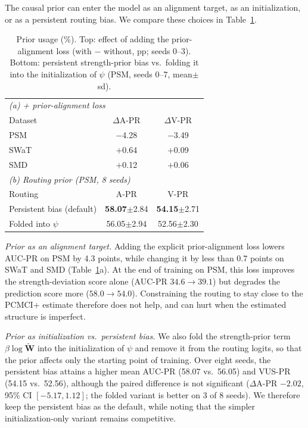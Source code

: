 The causal prior can enter the model as an alignment target, as an
initialization, or as a persistent routing bias. We compare these choices in
Table~\ref{tab:prior_usage}.

\begin{table}[t]
\centering
\caption{Prior usage (\%). Top: effect of adding the prior-alignment loss (with \(-\) without, pp; seeds 0--3). Bottom: persistent strength-prior bias vs.\ folding it into the initialization of \(\psi\) (PSM, seeds 0--7, mean\(\pm\)sd).}
\label{tab:prior_usage}
\small
\setlength{\tabcolsep}{4pt}
\begin{tabular}{lcc}
\toprule
\multicolumn{3}{l}{\emph{(a) + prior-alignment loss}} \\
Dataset & \(\Delta\)A-PR & \(\Delta\)V-PR \\
\midrule
PSM  & \(-\)4.28 & \(-\)3.49 \\
SWaT & \(+\)0.64 & \(+\)0.09 \\
SMD  & \(+\)0.12 & \(+\)0.06 \\
\midrule
\multicolumn{3}{l}{\emph{(b) Routing prior (PSM, 8 seeds)}} \\
Routing & A-PR & V-PR \\
\midrule
Persistent bias (default) & \textbf{58.07}\(\pm\)2.84 & \textbf{54.15}\(\pm\)2.71 \\
Folded into \(\psi\)      & 56.05\(\pm\)2.94 & 52.56\(\pm\)2.30 \\
\bottomrule
\end{tabular}
\end{table}

\emph{Prior as an alignment target.} Adding the explicit prior-alignment loss
lowers AUC-PR on PSM by 4.3 points, while changing it by less than 0.7 points
on SWaT and SMD (Table~\ref{tab:prior_usage}a). At the end of training on PSM,
this loss improves the strength-deviation score alone (AUC-PR
\(34.6\rightarrow39.1\)) but degrades the prediction score more
(\(58.0\rightarrow54.0\)). Constraining the routing to stay close to the
PCMCI+ estimate therefore does not help, and can hurt when the estimated
structure is imperfect.

\emph{Prior as initialization vs.\ persistent bias.} We also fold the
strength-prior term \(\beta\log\tilde{\mathbf{W}}\) into the initialization of
\(\psi\) and remove it from the routing logits, so that the prior affects only
the starting point of training. Over eight seeds, the persistent bias attains
a higher mean AUC-PR (58.07 vs.\ 56.05) and VUS-PR (54.15 vs.\ 52.56), although
the paired difference is not significant (\(\Delta\)A-PR \(-2.02\), 95\% CI
\([-5.17, 1.12]\); the folded variant is better on 3 of 8 seeds). We therefore
keep the persistent bias as the default, while noting that the simpler
initialization-only variant remains competitive.

